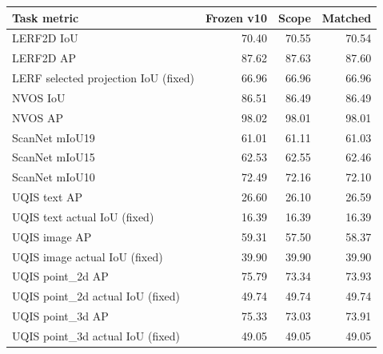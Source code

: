 \begin{tabular}{lrrr}
\toprule
Task metric & Frozen v10 & Scope & Matched \\
\midrule
LERF2D IoU & 70.40 & 70.55 & 70.54 \\
LERF2D AP & 87.62 & 87.63 & 87.60 \\
LERF selected projection IoU (fixed) & 66.96 & 66.96 & 66.96 \\
NVOS IoU & 86.51 & 86.49 & 86.49 \\
NVOS AP & 98.02 & 98.01 & 98.01 \\
ScanNet mIoU19 & 61.01 & 61.11 & 61.03 \\
ScanNet mIoU15 & 62.53 & 62.55 & 62.46 \\
ScanNet mIoU10 & 72.49 & 72.16 & 72.10 \\
UQIS text AP & 26.60 & 26.10 & 26.59 \\
UQIS text actual IoU (fixed) & 16.39 & 16.39 & 16.39 \\
UQIS image AP & 59.31 & 57.50 & 58.37 \\
UQIS image actual IoU (fixed) & 39.90 & 39.90 & 39.90 \\
UQIS point\_2d AP & 75.79 & 73.34 & 73.93 \\
UQIS point\_2d actual IoU (fixed) & 49.74 & 49.74 & 49.74 \\
UQIS point\_3d AP & 75.33 & 73.03 & 73.91 \\
UQIS point\_3d actual IoU (fixed) & 49.05 & 49.05 & 49.05 \\
\bottomrule
\end{tabular}
